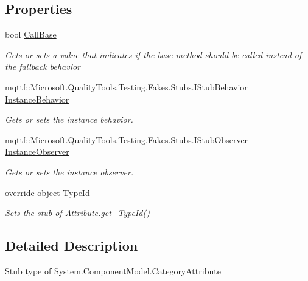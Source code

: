 \subsection*{Properties}
\begin{DoxyCompactItemize}
\item 
bool \hyperlink{class_system_1_1_component_model_1_1_fakes_1_1_stub_category_attribute_a29e7cbc4ee6ab96279e4bab37a9f1605}{Call\-Base}
\begin{DoxyCompactList}\small\item\em Gets or sets a value that indicates if the base method should be called instead of the fallback behavior\end{DoxyCompactList}\item 
mqttf\-::\-Microsoft.\-Quality\-Tools.\-Testing.\-Fakes.\-Stubs.\-I\-Stub\-Behavior \hyperlink{class_system_1_1_component_model_1_1_fakes_1_1_stub_category_attribute_a7a02ea63ab6ccb46b5f5a3010fc17bf9}{Instance\-Behavior}
\begin{DoxyCompactList}\small\item\em Gets or sets the instance behavior.\end{DoxyCompactList}\item 
mqttf\-::\-Microsoft.\-Quality\-Tools.\-Testing.\-Fakes.\-Stubs.\-I\-Stub\-Observer \hyperlink{class_system_1_1_component_model_1_1_fakes_1_1_stub_category_attribute_a1131d3cfe3c27c60f558da33002e2055}{Instance\-Observer}
\begin{DoxyCompactList}\small\item\em Gets or sets the instance observer.\end{DoxyCompactList}\item 
override object \hyperlink{class_system_1_1_component_model_1_1_fakes_1_1_stub_category_attribute_ae250ab73aca029ecd68c4b8bb545a6c3}{Type\-Id}
\begin{DoxyCompactList}\small\item\em Sets the stub of Attribute.\-get\-\_\-\-Type\-Id()\end{DoxyCompactList}\end{DoxyCompactItemize}


\subsection{Detailed Description}
Stub type of System.\-Component\-Model.\-Category\-Attribute



